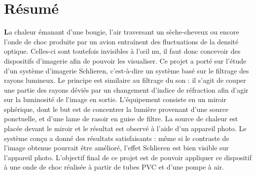 \section*{Résumé}
\textbf{L}a chaleur émanant d’une bougie, l’air traversant un sèche-cheveux ou encore l’onde de choc produite par un avion entraînent des fluctuations de la densité optique. Celles-ci sont toutefois invisibles à l’œil nu, il faut donc concevoir des dispositifs d’imagerie afin de pouvoir les visualiser. Ce projet a porté sur l’étude d’un système d’imagerie Schlieren, c’est-à-dire un système basé sur le filtrage des rayons lumineux. Le principe est similaire au filtrage du son : il s’agit de couper une partie des rayons déviés par un changement d’indice de réfraction afin d’agir sur la luminosité de l’image en sortie. L’équipement consiste en un miroir sphérique, dont le but est de concentrer la lumière provenant d’une source ponctuelle, et d’une lame de rasoir en guise de filtre. La source de chaleur est placée devant le miroir et le résultat est observé à l’aide d’un appareil photo. Le système conçu a donné des résultats satisfaisants : même si le contraste de l’image obtenue pourrait être amélioré, l’effet Schlieren est bien visible sur l’appareil photo. L’objectif final de ce projet est de pouvoir appliquer ce dispositif à une onde de choc réalisée à partir de tubes PVC et d’une pompe à air.
